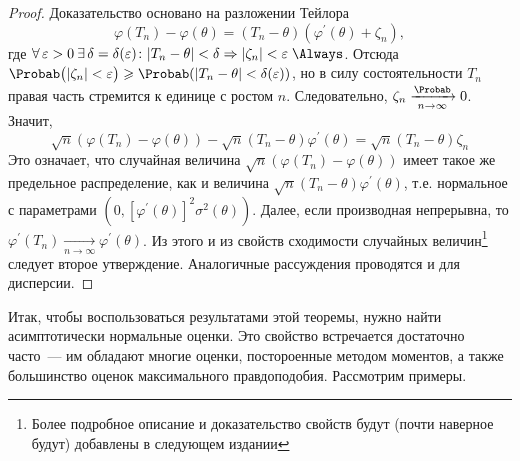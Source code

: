 \begin{proof}
    Доказательство основано на разложении Тейлора
    \begin{equation*}
        \varphi(T_n) - \varphi(\theta) = (T_n - \theta) (\varphi^\prime(\theta) + \zeta_n), 
    \end{equation*}
    где $\forall \, \varepsilon > 0 \: \exists \, \delta = \delta(\varepsilon)\colon |T_n - \theta| < \delta \Rightarrow |\zeta_n| < \varepsilon \; \Always$.
    Отсюда $\Probab \bigl(|\zeta_n| < \varepsilon \bigr) \geqslant \Probab(|T_n - \theta| < \delta(\varepsilon))$, 
    но в силу состоятельности $T_n$ правая часть стремится к единице с ростом $n$.
    Следовательно, $\zeta_n \xrightarrow[n \to \infty]{\Probab} 0$.
    Значит, 
    \begin{equation*}
        \sqrt{n}(\varphi(T_n) - \varphi(\theta)) - \sqrt{n}(T_n - \theta) \varphi^\prime(\theta) = \sqrt{n}(T_n - \theta) \zeta_n
    \end{equation*}
    Это означает, что случайная величина $\sqrt{n}(\varphi(T_n) - \varphi(\theta))$ имеет такое же предельное распределение, 
    как и величина $\sqrt{n}(T_n - \theta) \varphi^\prime(\theta)$, т.е. нормальное с параметрами $(0, [\varphi^\prime(\theta)]^2 \sigma^2(\theta))$.
    Далее, если производная непрерывна, то $\varphi^\prime(T_n) \xrightarrow[n \to \infty]{} \varphi^\prime(\theta)$.
    Из этого и из свойств сходимости случайных величин\footnote{Более подробное описание и доказательство свойств будут (почти наверное будут) добавлены в следующем издании} следует второе утверждение.
    Аналогичные рассуждения проводятся и для дисперсии.
\end{proof}

Итак, чтобы воспользоваться результатами этой теоремы, нужно найти асимптотически нормальные оценки.
Это свойство встречается достаточно часто~--- им обладают многие оценки, постороенные методом моментов, а также большинство оценок максимального правдоподобия.
Рассмотрим примеры.

